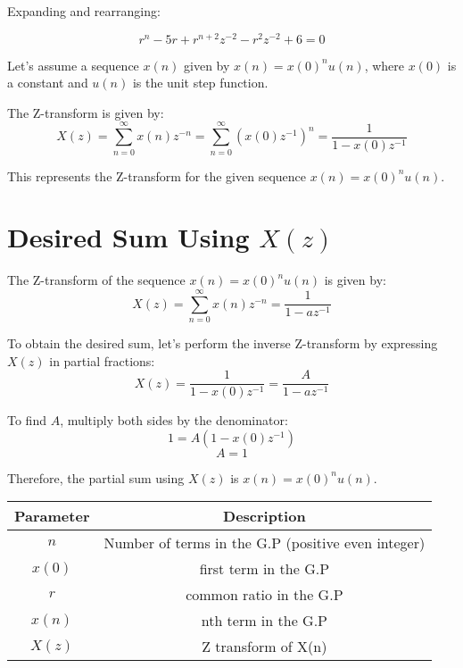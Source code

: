 \documentclass{article}
\begin{document}
Expanding and rearranging:

\[
r^n - 5r + r^{n+2}z^{-2} - r^2z^{-2} +6 = 0
\]

Let's assume a sequence \( x(n) \) given by \( x(n) =x(0)^n u(n) \), where \( x(0) \) is a constant and \( u(n) \) is the unit step function.

The Z-transform is given by:
\[ X(z) = \sum_{n=0}^{\infty} x(n)z^{-n} = \sum_{n=0}^{\infty} (x(0)z^{-1})^n = \frac{1}{1 - x(0)z^{-1}} \]

This represents the Z-transform for the given sequence \( x(n) = x(0)^n u(n) \).

\section*{Desired Sum Using $X(z)$}
The Z-transform of the sequence \( x(n) = x(0)^n u(n) \) is given by:
\[ X(z) = \sum_{n=0}^{\infty} x(n)z^{-n} = \frac{1}{1 - az^{-1}} \]

To obtain the desired sum, let's perform the inverse Z-transform by expressing \( X(z) \) in partial fractions:
\[ X(z) = \frac{1}{1 - x(0)z^{-1}} = \frac{A}{1 - az^{-1}} \]

To find \(A\), multiply both sides by the denominator:
\[ 1 = A(1 - x(0)z^{-1}) \]
\[ A = 1 \]

Therefore, the partial sum using \(X(z)\) is \(x(n) = x(0)^n u(n)\).


\begin{table}[h!]
\centering
\begin{tabular}{|c|c|}
\hline
Parameter & Description \\
\hline
\( n \) & Number of terms in the G.P (positive even integer) \\
\hline
\(x(0) \) & first term in the G.P \\
\hline
\( r \) & common ratio in the G.P \\
\hline
\( x(n) \) & nth term in the G.P \\
\hline
\( X(z) \) & Z transform of X(n) \\
\hline
\end{tabular}
\end{table}
\end{document}
